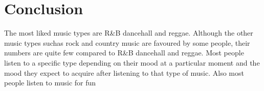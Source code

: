 \documentclass[12pt, a4paper]{report}
\begin{document}
\section*{Conclusion}


The most liked music types are R\&B dancehall and reggae. Although the other music types suchas rock and country music are favoured by some people, their numbers are quite few compared to R\&B dancehall and reggae.
Most people listen to a specific type depending on their mood at a particular moment and the mood they expect to acquire after listening to that type of music. Also most people listen to music for fun
\end{document}
